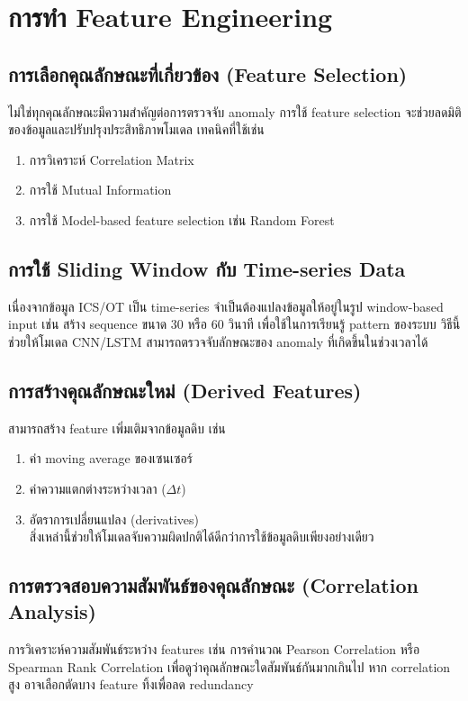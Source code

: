 \section{การทำ Feature Engineering}

\subsection{การเลือกคุณลักษณะที่เกี่ยวข้อง (Feature Selection)}
\hspace{2em} ไม่ใช่ทุกคุณลักษณะมีความสำคัญต่อการตรวจจับ anomaly การใช้ feature selection จะช่วยลดมิติของข้อมูลและปรับปรุงประสิทธิภาพโมเดล เทคนิคที่ใช้เช่น
\begin{enumerate}
  \item การวิเคราะห์ Correlation Matrix
  \item การใช้ Mutual Information
  \item การใช้ Model-based feature selection เช่น Random Forest
\end{enumerate}


\subsection{การใช้ Sliding Window กับ Time-series Data}
\hspace{2em} เนื่องจากข้อมูล ICS/OT เป็น time-series จำเป็นต้องแปลงข้อมูลให้อยู่ในรูป window-based input เช่น สร้าง sequence ขนาด 30 หรือ 60 วินาที เพื่อใช้ในการเรียนรู้ pattern ของระบบ วิธีนี้ช่วยให้โมเดล CNN/LSTM สามารถตรวจจับลักษณะของ anomaly ที่เกิดขึ้นในช่วงเวลาได้

\subsection{การสร้างคุณลักษณะใหม่ (Derived Features)}
\hspace{2em} สามารถสร้าง feature เพิ่มเติมจากข้อมูลดิบ เช่น
\begin{enumerate}
  \item ค่า moving average ของเซนเซอร์
  \item ค่าความแตกต่างระหว่างเวลา ($\Delta t$)
  \item อัตราการเปลี่ยนแปลง (derivatives) \\ สิ่งเหล่านี้ช่วยให้โมเดลจับความผิดปกติได้ดีกว่าการใช้ข้อมูลดิบเพียงอย่างเดียว
\end{enumerate}

\subsection{การตรวจสอบความสัมพันธ์ของคุณลักษณะ (Correlation Analysis)}
\hspace{2em} การวิเคราะห์ความสัมพันธ์ระหว่าง features เช่น การคำนวณ Pearson Correlation หรือ Spearman Rank Correlation เพื่อดูว่าคุณลักษณะใดสัมพันธ์กันมากเกินไป หาก correlation สูง อาจเลือกตัดบาง feature ทิ้งเพื่อลด redundancy

